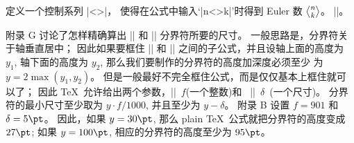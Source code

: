 \def\euler{\atopwithdelims<>}
\ddangerexercise 定义一个控制系列 |\euler|，
使得在公式中输入`|{n\euler k}|'时得到 Euler 数 $n\euler k$。
\answer|\def\euler{\atopwithdelims<>}|。

\ddanger 附录 G 讨论了怎样精确算出 |\left| 和 |\right| 分界符所要的尺寸。%
一般思路是，分界符关于轴垂直居中；
因此如果要框住 |\left| 和 |\right| 之间的子公式，并且设轴上面的高度为 $y_1$,
轴下面的高度为 $y_2$, 那么我们要制作的分界符的高度加深度必须至少%
为 $y=2\max(y_1,y_2)$。%
但是一般最好不完全框住公式，而是仅仅基本上框住就可以了；
因此 \TeX\ 允许给出两个参数，|\delimiterfactor|~$f$(一个整数)和%
~|\delimitershortfall|~$\delta$~(一个尺寸)。%
分界符的最小尺寸至少取为 $y\cdot f/1000$, 并且至少为 $y-\delta$。%
附录 B 设置 $f=901$ 和 $\delta=5\pt$。%
因此，如果 $y=30\pt$, 那么 plain \TeX\ 公式就把分界符的高度变成 $27\pt$;
如果 $y=100\pt$, 相应的分界符的高度至少为 $95\pt$。

